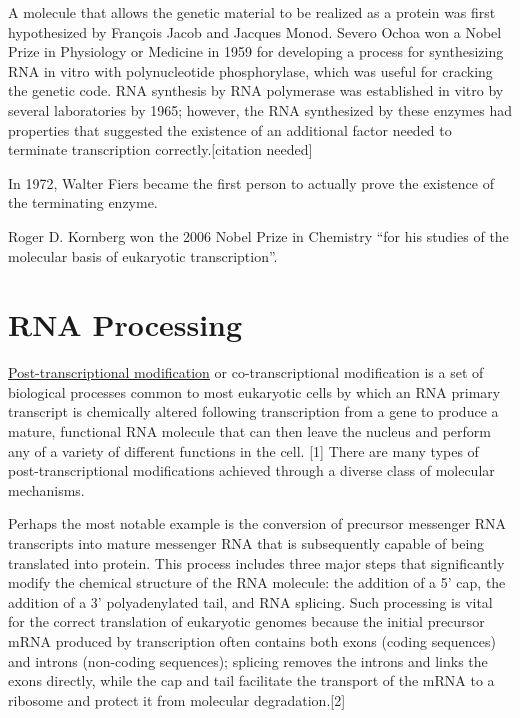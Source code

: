 A molecule that allows the genetic material to be realized as a protein was first hypothesized by François Jacob and Jacques Monod. Severo Ochoa won a Nobel Prize in Physiology or Medicine in 1959 for developing a process for synthesizing RNA in vitro with polynucleotide phosphorylase, which was useful for cracking the genetic code. RNA synthesis by RNA polymerase was established in vitro by several laboratories by 1965; however, the RNA synthesized by these enzymes had properties that suggested the existence of an additional factor needed to terminate transcription correctly.{[}citation needed{]}

In 1972, Walter Fiers became the first person to actually prove the existence of the terminating enzyme.

Roger D. Kornberg won the 2006 Nobel Prize in Chemistry ``for his studies of the molecular basis of eukaryotic transcription''.

\hypertarget{rna-processing}{%
\section{RNA Processing}\label{rna-processing}}

\href{https://en.wikipedia.org/wiki/Post-transcriptional_modification}{Post-transcriptional modification} or co-transcriptional modification is a set of biological processes common to most eukaryotic cells by which an RNA primary transcript is chemically altered following transcription from a gene to produce a mature, functional RNA molecule that can then leave the nucleus and perform any of a variety of different functions in the cell. {[}1{]} There are many types of post-transcriptional modifications achieved through a diverse class of molecular mechanisms.

Perhaps the most notable example is the conversion of precursor messenger RNA transcripts into mature messenger RNA that is subsequently capable of being translated into protein. This process includes three major steps that significantly modify the chemical structure of the RNA molecule: the addition of a 5' cap, the addition of a 3' polyadenylated tail, and RNA splicing. Such processing is vital for the correct translation of eukaryotic genomes because the initial precursor mRNA produced by transcription often contains both exons (coding sequences) and introns (non-coding sequences); splicing removes the introns and links the exons directly, while the cap and tail facilitate the transport of the mRNA to a ribosome and protect it from molecular degradation.{[}2{]}

